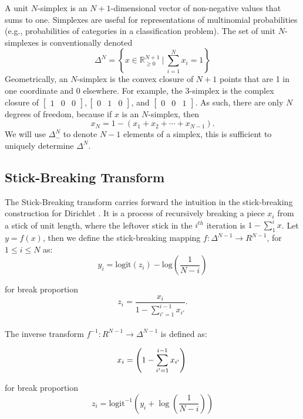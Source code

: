 \documentclass[11pt]{article}
\newcommand{\setcomp}[2]{\left\{ #1 \ \Big|\ #2 \right\}}
\begin{document}
A unit $N$-simplex is an $N + 1$-dimensional vector of non-negative
values that sums to one.  Simplexes are useful for representations of multinomial probabilities
(e.g., probabilities of categories in a classification problem). The set of unit $N$-simplexes is conventionally denoted
\[
  \Delta^N = \setcomp{x \in \mathbb{R}_{\ge 0}^{N + 1}}{ \sum_{i=1}^{N} x_i = 1}
\]
Geometrically, an $N$-simplex is the convex closure of $N+1$ points
that are 1 in one coordinate and 0 elsewhere.  For example, the
3-simplex is the complex closure of
$\begin{bmatrix}1 & 0 & 0 \end{bmatrix},
\begin{bmatrix} 0 & 1 & 0 \end{bmatrix}$,
and $\begin{bmatrix} 0 & 0 & 1 \end{bmatrix}$. As such, there are only $N$ degrees of
freedom, because if $x$ is an $N$-simplex, then
\[
  x_N = 1 - (x_1 + x_2 + \cdots + x_{N-1}).
\]
We will use $\Delta^N_-$ to denote $N-1$ elements of a simplex, this is sufficient to uniquely determine $\Delta^N$.
\subsection{Stick-Breaking Transform}

The Stick-Breaking transform carries forward the intuition in the stick-breaking construction for Dirichlet \cite{sethuraman1994constructive}. It is a process of recursively breaking a piece $x_i$ from a stick of unit length, where the leftover stick in the $i^{th}$ iteration is $ 1 - \sum_{1}^{i}x$. Let $y = f(x)$, then we define the stick-breaking mapping $ f \colon \Delta^{N-1} \to  R^{N-1}$, for $1 \leq i \leq N$ as:	
\[
y_i
= \mathrm{logit}(z_i) - \mbox{log}\left(\frac{1}{N-i}
   \right) 
   \]
  
for break proportion 
\[ 
 z_i = \frac{x_i}{1 - \sum_{i' = 1}^{i-1} x_{i'}}.
\]\\

The inverse transform $ f^{-1} \colon R^{N-1} \to \Delta^{N-1}$ is defined as:

\[
x_i = \left( 1 - \sum_{i'=1}^{i-1} x_{i'} \right)\\
\]

for break proportion \[z_i = \mathrm{logit}^{-1} \left( y_i  + \log \left( \frac{1}{N - i}
                                            \right)\right)
                                            \]\\
                                            
\end{document}
